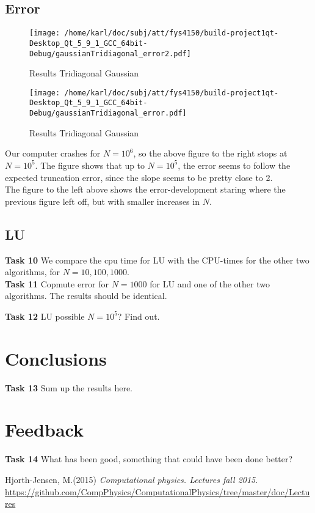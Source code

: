 \documentclass{article}
\begin{document}
\subsection{Error}
\begin{minipage}{.49\textwidth} %
\begin{figure}[H]
	\centering
	\texttt{[image: /home/karl/doc/subj/att/fys4150/build-project1qt-Desktop\_Qt\_5\_9\_1\_GCC\_64bit-Debug/gaussianTridiagonal\_error2.pdf]}
	\caption{Results Tridiagonal Gaussian}
\end{figure}
\end{minipage}\hfill
\begin{minipage}{.49\textwidth}
\begin{figure}[H]
	\centering
	\texttt{[image: /home/karl/doc/subj/att/fys4150/build-project1qt-Desktop\_Qt\_5\_9\_1\_GCC\_64bit-Debug/gaussianTridiagonal\_error.pdf]}
	\caption{Results Tridiagonal Gaussian}
\end{figure}

\end{minipage}\hfill




Our computer crashes for $N = 10^6$, so the above figure to the right stops at $N = 10^5$. The figure shows that up to $N = 10^5$, the error seems to follow the expected truncation error, since the slope seems to be pretty close to 2.\\

The figure to the left above shows the error-development staring where the previous figure left off, but with smaller increases in $N$.


\subsection{LU}
\textbf{Task 10} We compare the cpu time for LU with the CPU-times for the other two algorithms, for $N=10, 100, 1000$. \\

\textbf{Task 11} Copmute error for $N=1000$ for LU and one of the other two algorithms. The results should be identical.

\textbf{Task 12} LU possible $N=10^5$? Find out.

\section{Conclusions}
\textbf{Task 13} Sum up the results here.

\section{Feedback}
\textbf{Task 14} What has been good, something that could have been done better?

\begin{thebibliography}{9}
	Hjorth-Jensen, M.(2015)
	\textit{Computational physics. Lectures fall 2015}. 
	\url{https://github.com/CompPhysics/ComputationalPhysics/tree/master/doc/Lectures}
\end{thebibliography}
\end{document}
